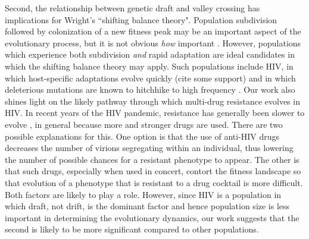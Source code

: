 \documentclass[rmp]{revtex4}
\begin{document}
Second, the relationship between genetic draft and valley crossing has implications for Wright's ``shifting balance theory".
Population subdivision followed by colonization of a new fitness peak may be an important aspect of the evolutionary process, but it is not obvious \emph{how} important \citep{coyne_barton_turelli_2000}.
However, populations which experience both subdivision \emph{and} rapid adaptation are ideal candidates in which the shifting balance theory may apply.
Such populations include HIV, in which host-specific adaptations evolve quickly (cite some support) and in which deleterious mutations are known to hitchhike to high frequency \citep{zanini_2013, zanini_2015}.
Our work also shines light on the likely pathway through which multi-drug resistance evolves in HIV.
In recent years of the HIV pandemic, resistance has generally been slower to evolve \citep{feder_2015}, in general because more and stronger drugs are used.
There are two possible explanations for this.
One option is that the use of anti-HIV drugs decreases the number of virions segregating within an individual, thus lowering the number of possible chances for a resistant phenotype to appear.
The other is that such drugs, especially when used in concert, contort the fitness landscape so that evolution of a phenotype that is resistant to a drug cocktail is more difficult.
Both factors are likely to play a role.
However, since HIV is a population in which draft, not drift, is the dominant factor and hence population size is less important in determining the evolutionary dynamics, our work suggests that the second is likely to be more significant compared to other populations.



\end{document}
